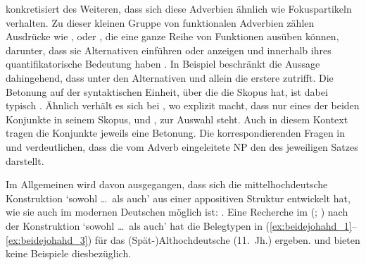 \citet[425--428]{johannessen2005} konkretisiert des Weiteren, dass sich diese
Adverbien ähnlich wie Fokuspartikeln verhalten. Zu
dieser kleinen Gruppe von funktionalen Adverbien zählen Ausdrücke
wie ,  oder , die eine ganze Reihe von Funktionen
ausüben können, darunter, dass sie Alternativen einführen oder anzeigen und
innerhalb ihres  quantifikatorische Bedeutung
haben \autocite[vgl.][1--4, 15]{koenig1991}. In Beispiel 
beschränkt  die Aussage dahingehend, dass unter den Alternativen
 und  allein die erstere zutrifft. Die Betonung auf der
syntaktischen Einheit, über die die  Skopus hat, ist
dabei typisch \autocite[10--14]{koenig1991}. Ähnlich verhält es sich bei
, wo  explizit macht, dass nur eines der beiden
Konjunkte in seinem Skopus,  und , zur Auswahl steht. Auch in
diesem Kontext tragen die Konjunkte jeweils eine Betonung. Die
korrespondierenden Fragen in  und 
verdeutlichen, dass die vom Adverb eingeleitete NP
den  des jeweiligen Satzes darstellt.

\begin{exe}
\end{exe}

Im Allgemeinen wird davon ausgegangen, dass sich die
mittelhochdeutsche Konstruktion 
`sowohl \dots\ als auch' aus einer appositiven Struktur
entwickelt hat, wie sie auch im modernen Deutschen möglich
ist:  \autocite[vgl.][626--627 und die
dortigen Referenzen]{ksw2}. Eine Recherche im  (;
\nosh\cite{ddd}) nach der Konstruktion  `sowohl \dots\
als auch' \autocite[vgl.][49]{schuetzeichel2012} hat die Belegtypen in
(\ref{ex:beidejohahd_1}--\ref{ex:beidejohahd_3}) für das
(Spät-)Althochdeutsche (11.~Jh.) ergeben. \citet{braune2018}
und \citet{schrodt2004} bieten keine Beispiele dies\-bezüglich.

